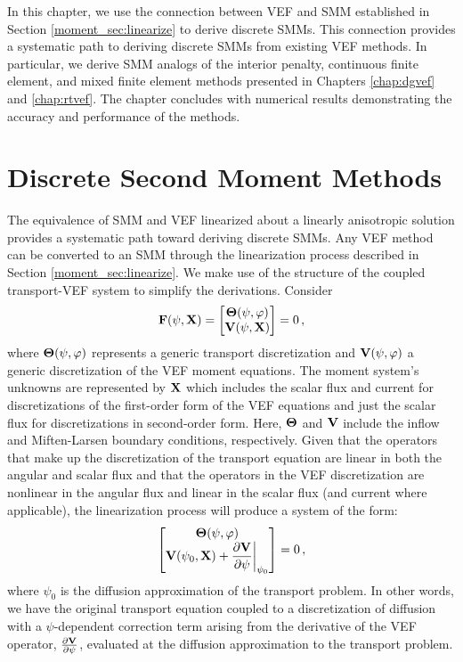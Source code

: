 \documentclass[../doc.tex]{subfiles}
\begin{document}
In this chapter, we use the connection between VEF and SMM established in Section \ref{moment_sec:linearize} to derive discrete SMMs. This connection provides a systematic path to deriving discrete SMMs from existing VEF methods. In particular, we derive SMM analogs of the interior penalty, continuous finite element, and mixed finite element methods presented in Chapters \ref{chap:dgvef} and \ref{chap:rtvef}. The chapter concludes with numerical results demonstrating the accuracy and performance of the methods. 

\section{Discrete Second Moment Methods}
The equivalence of SMM and VEF linearized about a linearly anisotropic solution provides a systematic path toward deriving discrete SMMs. Any VEF method can be converted to an SMM through the linearization process described in Section \ref{moment_sec:linearize}. We make use of the structure of the coupled transport-VEF system to simplify the derivations. Consider
	\begin{equation}
		\boldsymbol{\mathrm{F}}(\psi,\boldsymbol{\mathrm{X}}) = \begin{bmatrix} 
			\boldsymbol{\mathrm{\Theta}}(\psi,\varphi) \\ \boldsymbol{\mathrm{V}}(\psi,\boldsymbol{\mathrm{X}}) 
		\end{bmatrix} = 0\,,
	\end{equation}
where $\boldsymbol{\mathrm{\Theta}}(\psi,\varphi)$ represents a generic transport discretization and $\boldsymbol{\mathrm{V}}(\psi,\varphi)$ a generic discretization of the VEF moment equations. The moment system's unknowns are represented by $\boldsymbol{\mathrm{X}}$ which includes the scalar flux and current for discretizations of the first-order form of the VEF equations and just the scalar flux for discretizations in second-order form. 
Here, $\boldsymbol{\mathrm{\Theta}}$ and $\boldsymbol{\mathrm{V}}$ include the inflow and Miften-Larsen boundary conditions, respectively. 
Given that the operators that make up the discretization of the transport equation are linear in both the angular and scalar flux and that the operators in the VEF discretization are nonlinear in the angular flux and linear in the scalar flux (and current where applicable), the linearization process will produce a system of the form: 
	\begin{equation}
		\begin{bmatrix} 
			\boldsymbol{\mathrm{\Theta}}(\psi,\varphi) \\
			\displaystyle\boldsymbol{\mathrm{V}}(\psi_0,\boldsymbol{\mathrm{X}}) + \frac{\partial \boldsymbol{\mathrm{V}}}{\partial \psi}\biggr\rvert_{\psi_0}
		\end{bmatrix} = 0 \,, 
	\end{equation}
where $\psi_0$ is the diffusion approximation of the transport problem. 
In other words, we have the original transport equation coupled to a discretization of diffusion with a $\psi$-dependent correction term arising from the derivative of the VEF operator, $\frac{\partial \boldsymbol{\mathrm{V}}}{\partial \psi}$, evaluated at the diffusion approximation to the transport problem. 
\end{document}
